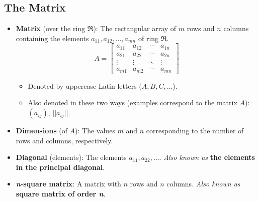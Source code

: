 \documentclass[titlepage]{article}
\numberwithin{figure}{section}
\numberwithin{equation}{section}
\numberwithin{theorem}{section}
\begin{document}
\subsection{The Matrix}
\begin{itemize}
    \item \textbf{Matrix} (over the ring $\mathfrak{R}$): The rectangular array of $m$ rows and $n$ columns containing the elements $a_{11},a_{12},\dots,a_{mn}$ of ring $\mathfrak{R}$.
    \begin{equation*}
        A=
        \begin{bmatrix}
            a_{11} & a_{12} & \cdots & a_{1n}\\
            a_{21} & a_{22} & \cdots & a_{2n}\\
            \vdots & \vdots & \ddots & \vdots\\
            a_{m1} & a_{m2} & \cdots & a_{mn}
        \end{bmatrix}
    \end{equation*}
    \begin{itemize}
        \item Denoted by uppercase Latin letters ($A,B,C,\dots$).
        \item Also denoted in these two ways (examples correspond to the matrix $A$): $(a_{ij})$, $||a_{ij}||$.
    \end{itemize}
    \item \textbf{Dimensions} (of $A$): The values $m$ and $n$ corresponding to the number of rows and columns, respectively.
    \item \textbf{Diagonal} (elements): The elements $a_{11},a_{22},\dots$. \emph{Also known as} \textbf{the elements in the principal diagonal}.
    \item \textbf{\emph{n}-square matrix}: A matrix with $n$ rows and $n$ columns. \emph{Also known as} \textbf{square matrix of order \emph{n}}.
\end{itemize}
\end{document}
